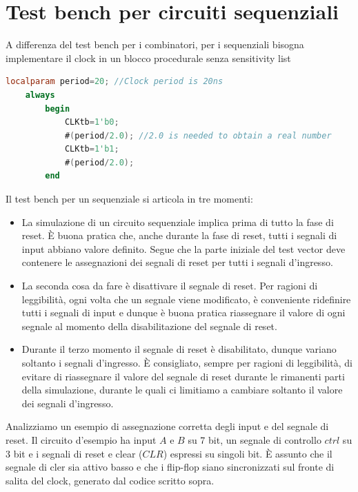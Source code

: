 \documentclass{book}
\begin{document}
    \section{Test bench per circuiti sequenziali}
        A differenza del test bench per i combinatori, per i sequenziali bisogna implementare
        il clock in un blocco procedurale senza sensitivity list
        \begin{lstlisting}[language=Verilog]
localparam period=20; //Clock period is 20ns
    always
        begin
            CLKtb=1'b0;
            #(period/2.0); //2.0 is needed to obtain a real number
            CLKtb=1'b1;     
            #(period/2.0);
        end
        \end{lstlisting}
        Il test bench per un sequenziale si articola in tre momenti:
        \begin{itemize}
            \item La simulazione di un circuito sequenziale implica prima di tutto la fase di 
            reset. È buona pratica che, anche durante la fase di reset, tutti i segnali di input
            abbiano valore definito. Segue che la parte iniziale del test vector deve contenere
            le assegnazioni dei segnali di reset per tutti i segnali d'ingresso. 
            \item La seconda cosa da fare è disattivare il segnale di reset. Per ragioni di leggibilità,
            ogni volta che un segnale viene modificato, è conveniente ridefinire tutti i segnali di input
            e dunque è buona pratica riassegnare il valore di ogni segnale al momento della disabilitazione
            del segnale di reset.
            \item Durante il terzo momento il segnale di reset è disabilitato, dunque variano
            soltanto i segnali d'ingresso. È consigliato, sempre per ragioni di leggibilità, di evitare
            di riassegnare il valore del segnale di reset durante le rimanenti parti della simulazione, durante
            le quali ci limitiamo a cambiare soltanto il valore dei segnali d'ingresso.
        \end{itemize}
        Analizziamo un esempio di assegnazione corretta degli input e del segnale di reset. Il circuito
        d'esempio ha input $A$ e $B$ su 7 bit, un segnale di controllo $ctrl$ su 3 bit e i segnali di reset e 
        clear ($CLR$) espressi su singoli bit. È assunto che il segnale di cler sia attivo basso e che i 
        flip-flop siano sincronizzati sul fronte di salita del clock, generato dal codice scritto sopra.
\end{document}
